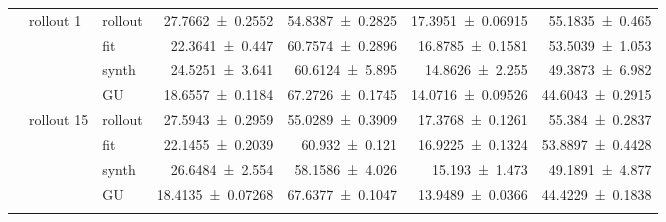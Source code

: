 {\begin{longtable}{@{}lllrrrr@{}}
    \addlinespace[2pt]
     & rollout 1 & rollout & \num{27.7662+-0.2552} & \num{54.8387+-0.2825} & \num{17.3951+-0.06915} & \num{55.1835+-0.465} \\
     &  & fit & \num{22.3641+-0.447} & \num{60.7574+-0.2896} & \num{16.8785+-0.1581} & \num{53.5039+-1.053} \\
     &  & synth & \num{24.5251+-3.641} & \num{60.6124+-5.895} & \num{14.8626+-2.255} & \num{49.3873+-6.982} \\
     &  & GU & \num{18.6557+-0.1184} & \num{67.2726+-0.1745} & \num{14.0716+-0.09526} & \num{44.6043+-0.2915} \\
    \addlinespace[2pt]
     & rollout 15 & rollout & \num{27.5943+-0.2959} & \num{55.0289+-0.3909} & \num{17.3768+-0.1261} & \num{55.384+-0.2837} \\
     &  & fit & \num{22.1455+-0.2039} & \num{60.932+-0.121} & \num{16.9225+-0.1324} & \num{53.8897+-0.4428} \\
     &  & synth & \num{26.6484+-2.554} & \num{58.1586+-4.026} & \num{15.193+-1.473} & \num{49.1891+-4.877} \\
     &  & GU & \num{18.4135+-0.07268} & \num{67.6377+-0.1047} & \num{13.9489+-0.0366} & \num{44.4229+-0.1838} \\
    \addlinespace[2pt]
  \end{longtable}
}
